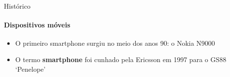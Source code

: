 \documentclass{beamer}
\begin{document}
\begin{frame}{Histórico}
	\framesubtitle{Dispositivos móveis}
	\begin{itemize}
		\item O primeiro smartphone surgiu no meio dos anos 90: o Nokia N9000
		\item O termo \textbf{smartphone} foi cunhado pela Ericsson em 1997 para o GS88 `Penelope'
	\end{itemize}
\end{frame}
\end{document}
